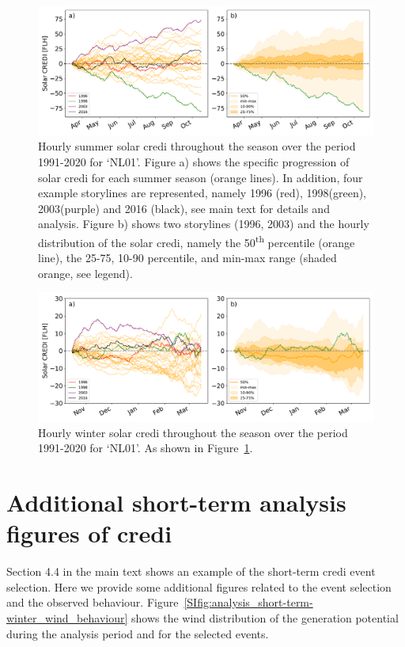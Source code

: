 \documentclass[12pt]{iopart}
\newcommand{\ts}[1]{\textsuperscript{#1}}
\newcommand{\credi}[0]{{\sc credi}}
\newcommand{\sdi}[0]{{\sc solar credi}}
\begin{document}
\begin{figure}[ht!]
    \centering
    \includegraphics[width=\textwidth]{Figures_SI/SolarCREDI_seasonal-summer}
    \caption{
    Hourly summer \sdi{} throughout the season over the period 1991-2020 for `NL01'.
    Figure a) shows the specific progression of \sdi{} for each summer season (orange lines).
    In addition, four example storylines are represented, namely 1996 (red), 1998(green), 2003(purple) and 2016 (black), see main text for details and analysis.
    Figure b) shows two storylines (1996, 2003) and the hourly distribution of the \sdi{}, namely the 50\ts{th} percentile (orange line), the 25-75, 10-90 percentile, and min-max range (shaded orange, see legend). 
    }
    \label{SIfig:analysis_season-summer_solar}
\end{figure}
\begin{figure}[h!]
    \centering
    \includegraphics[width=\textwidth]{Figures_SI/SolarCREDI_seasonal-winter}
    \caption{
    Hourly winter \sdi{} throughout the season over the period 1991-2020 for `NL01'.
    As shown in Figure~\ref{SIfig:analysis_season-summer_solar}.
    }
    \label{SIfig:analysis_season-winter_solar}
\end{figure}



\clearpage
\section{Additional short-term analysis figures of \credi}\label{app:shortterm}
Section 4.4 in the main text shows an example of the short-term \credi{} event selection.
Here we provide some additional figures related to the event selection and the observed behaviour.  
Figure~\ref{SIfig:analysis_short-term-winter_wind_behaviour} shows the wind distribution of the generation potential during the analysis period and for the selected events.
\end{document}
